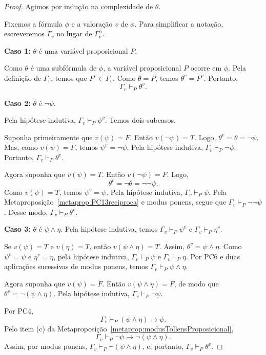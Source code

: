 \begin{proof}
    Agimos por indução na complexidade de $\theta$.

    Fixemos a fórmula $\phi$ e a valoração $v$ de $\phi$.
    Para simplificar a notação, escreveremos $\Gamma_v$ no lugar de $\Gamma_v^\phi$.

    \textbf{Caso 1:} $\theta$ é uma variável proposicional $P$.

    Como $\theta$ é uma subfórmula de $\phi$, a variável proposicional $P$ ocorre em $\phi$.
    Pela definição de $\Gamma_v$, temos que $P^v\in \Gamma_v$.
    Como $\theta=P$, temos $\theta^v=P^v$.
    Portanto,
    \[
        \Gamma_v\vdash_P \theta^v.
    \]

    \textbf{Caso 2:} $\theta$ é $\neg\psi$.

    Pela hipótese indutiva, $\Gamma_v\vdash_P \psi^v$.
    Temos dois subcasos.

    Suponha primeiramente que $v(\psi)=F$.
    Então $v(\neg\psi)=T$.
    Logo, $\theta^v=\theta=\neg\psi$.
    Mas, como $v(\psi)=F$, temos $\psi^v=\neg\psi$.
    Pela hipótese indutiva, $\Gamma_v\vdash_P \neg\psi$.
    Portanto, $\Gamma_v\vdash_P \theta^v$.

    Agora suponha que $v(\psi)=T$.
    Então $v(\neg\psi)=F$.
    Logo,
    \[
        \theta^v=\neg\theta=\neg\neg\psi.
    \]
    Como $v(\psi)=T$, temos $\psi^v=\psi$.
    Pela hipótese indutiva,
    $\Gamma_v\vdash_P \psi$.
    Pela Metaproposição~\ref{metaprop:PC13reciproca} e modus ponens, segue que $\Gamma_v\vdash_P \neg\neg\psi$.
    Desse modo, $\Gamma_v\vdash_P \theta^v$.

    \textbf{Caso 3:} $\theta$ é $\psi\land\eta$.
    Pela hipótese indutiva, temos $\Gamma_v\vdash_P \psi^v$ e $\Gamma_v\vdash_P \eta^v$.

    Se $v(\psi)=T$ e $v(\eta)=T$, então $v(\psi\land\eta)=T$.
    Assim, $\theta^v=\psi\land\eta$.
    Como $\psi^v=\psi$ e $\eta^v=\eta$, pela hipótese indutiva, $\Gamma_v\vdash_P \psi$ e $\Gamma_v\vdash_P \eta$.
    Por PC6 e duas aplicações sucessivas de modus ponens, temos $\Gamma_v\vdash_P \psi\land\eta$.

    Agora suponha que $v(\psi)=F$.
    Então $v(\psi\land\eta)=F$, de modo que $\theta^v=\neg(\psi\land\eta)$.
    Pela hipótese indutiva, $\Gamma_v\vdash_P \neg\psi$.

    Por PC4,
    \[
        \Gamma_v\vdash_P (\psi\land\eta)\rightarrow \psi.
    \]
    Pelo item (c) da Metaproposição~\ref{metaprop:modusTollensProposicional},
    \[
        \Gamma_v\vdash_P \neg\psi\rightarrow \neg(\psi\land\eta).
    \]
    Assim, por modus ponens, $\Gamma_v\vdash_P \neg(\psi\land\eta)$, e, portanto, $\Gamma_v\vdash_P \theta^v$.


\end{proof}
